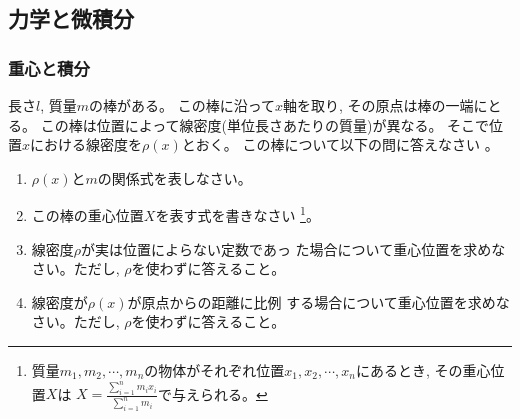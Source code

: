 \documentclass[twocolumn,11pt]{jarticle}
\begin{document}
\subsection{力学と微積分}

\subsubsection{重心と積分}

\nquestion
長さ$l$, 質量$m$の棒がある。
この棒に沿って$x$軸を取り, その原点は棒の一端にとる。
この棒は位置によって線密度(単位長さあたりの質量)が異なる。
そこで位置$x$における線密度を$\rho(x)$とおく。
この棒について以下の問に答えなさい
。
\begin{enumerate}
\item\label{item:stick-m} $\rho(x)$と$m$の関係式を表しなさい。
\item\label{item:stick-com} この棒の重心位置$X$を表す式を書きなさい
  \footnote{質量$m_1, m_2, \cdots, m_n$の物体がそれぞれ位置$x_1, x_2,
    \cdots, x_n$にあるとき,
    その重心位置$X$は
    $\displaystyle X=\frac{\displaystyle\sum_{i=1}^nm_ix_i}{\displaystyle\sum_{i=1}^nm_i}$で与えられる。
  }。
\item\label{item:stick-com-1} 線密度$\rho$が実は位置によらない定数であっ
  た場合について重心位置を求めなさい。ただし, $\rho$を使わずに答えること。
\item\label{item:stick-com-2} 線密度が$\rho(x)$が原点からの距離に比例
  する場合について重心位置を求めなさい。ただし, $\rho$を使わずに答えること。
\end{enumerate}
\end{document}
